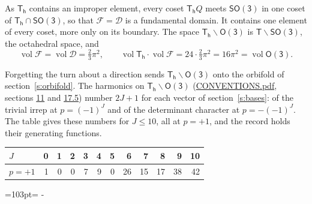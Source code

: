 \documentclass[10pt,a4paper]{article}
\newcommand{\needspace}[1]{\par\penalty-100\begingroup\dimen0=#1\relax\dimen2=\pagegoal
  \advance\dimen2-\pagetotal\ifdim\dimen0>\dimen2\relax\ifdim\dimen2>0pt\vfil\break\fi\fi
  \endgroup}
\numberwithin{equation}{section}
\newcommand{\grp}[1]{\mathsf{#1}}
\newcommand{\vol}{\operatorname{vol}}
\newcommand{\fcell}{\mathcal{D}}
\newcommand{\fdomain}{\mathcal{F}}
\begin{document}
\leavevmode\label{n:set.fundamental}As $\grp{T_{h}}$ contains an improper element, every coset $\grp{T_{h}}Q$ meets \href{SO3.pdf}{$\grp{SO(3)}$} in one coset of $\grp{T_{h}} \cap \grp{SO(3)}$, so that $\fdomain = \fcell$ is a fundamental domain. It contains one element of every coset, more only on its boundary.
The space $\grp{T_{h}}\backslash\grp{O(3)}$ is $\grp{T}\backslash\grp{SO(3)}$, the octahedral space, and
\begin{equation}\label{e:volume}\vol\fdomain = \vol\fcell = \tfrac{2}{3}\pi^2,\qquad \vol\grp{T_{h}}\cdot\vol\fdomain = 24\cdot \tfrac{2}{3}\pi^2 = 16\pi^2 = \vol\grp{O(3)}.\end{equation}

Forgetting the turn about a direction sends $\grp{T_{h}}\backslash\grp{O(3)}$ onto the orbifold of section~\ref{s:orbifold}.
The harmonics on $\grp{T_{h}}\backslash\grp{O(3)}$ (\href{../../CONVENTIONS.pdf}{CONVENTIONS.pdf}, sections \href{../../CONVENTIONS.pdf\#conv.11}{11} and \href{../../CONVENTIONS.pdf\#conv.17.5}{17.5}) number $2J + 1$ for each vector of section~\ref{s:bases}: of the trivial irrep at $p = (-1)^J$ and of the determinant character at $p = -(-1)^J$. The table gives these numbers for $J \le 10$, all at $p = +1$, and the record holds their generating functions.
{\small\setlength{\tabcolsep}{4pt}\begin{longtable}{@{}lrrrrrrrrrrr@{}}\toprule
$J$ & 0 & 1 & 2 & 3 & 4 & 5 & 6 & 7 & 8 & 9 & 10\\\midrule\endhead
\bottomrule\endfoot\endlastfoot
$p = +1$ & 1 & 0 & 0 & 7 & 9 & 0 & 26 & 15 & 17 & 38 & 42\\
\bottomrule\end{longtable}}
\needspace{103pt}
\end{document}
